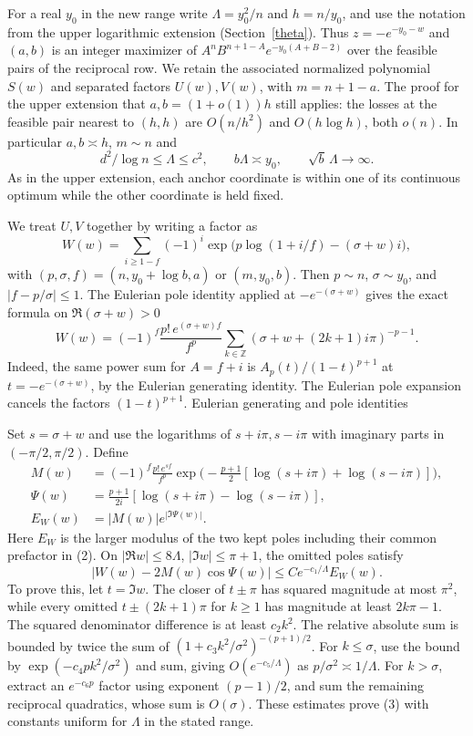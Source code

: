 \documentclass[11pt]{article}
\begin{document}
For a real $y_0$ in the new range write $\Lambda=y_0^2/n$ and $h=n/y_0$, and use the notation from the upper logarithmic extension (Section~\ref{theta}). Thus $z=-e^{-y_0-w}$ and $(a,b)$ is an integer maximizer of $A^nB^{n+1-A}e^{-y_0(A+B-2)}$ over the feasible pairs of the reciprocal row. We retain the associated normalized polynomial $S(w)$ and separated factors $U(w),V(w)$, with $m=n+1-a$. The proof for the upper extension that $a,b=(1+o(1))h$ still applies: the losses at the feasible pair nearest to $(h,h)$ are $O(n/h^2)$ and $O(h\log h)$, both $o(n)$. In particular $a,b\asymp h$, $m\sim n$ and
\[
 d^2/\log n\le\Lambda\le c^2,\qquad
 b\Lambda\asymp y_0,\qquad
 \sqrt b\,\Lambda\longrightarrow\infty .
 \tag{1}
\]
As in the upper extension, each anchor coordinate is within one of its continuous optimum while the other coordinate is held fixed.

We treat $U,V$ together by writing a factor as
\[
 W(w)=\sum_{i\ge1-f}(-1)^i
       \exp\bigl(p\log(1+i/f)-(\sigma+w)i\bigr),
\]
with $(p,\sigma,f)=(n,y_0+\log b,a)$ or $(m,y_0,b)$. Then $p\sim n$, $\sigma\sim y_0$, and $|f-p/\sigma|\le1$. The Eulerian pole identity applied at $-e^{-(\sigma+w)}$ gives the exact formula on $\Re(\sigma+w)>0$
\[
 W(w)=(-1)^f\frac{p!\,e^{(\sigma+w)f}}{f^p}
       \sum_{k\in\mathbb Z}(\sigma+w+(2k+1)i\pi)^{-p-1}.
 \tag{2}
\]
Indeed, the same power sum for $A=f+i$ is $A_p(t)/(1-t)^{p+1}$ at $t=-e^{-(\sigma+w)}$, by the Eulerian generating identity. The Eulerian pole expansion cancels the factors $(1-t)^{p+1}$. Eulerian generating and pole identities~\cite{disk}

Set $s=\sigma+w$ and use the logarithms of $s+i\pi,s-i\pi$ with imaginary parts in $(-\pi/2,\pi/2)$. Define
\[
 \begin{aligned}
 M(w)&=(-1)^f\frac{p!\,e^{sf}}{f^p}
        \exp\bigl(-\tfrac{p+1}{2}[\log(s+i\pi)+\log(s-i\pi)]\bigr),\\
 \Psi(w)&=\tfrac{p+1}{2i}[\log(s+i\pi)-\log(s-i\pi)],\\
 E_W(w)&=|M(w)|e^{|\Im\Psi(w)|}.
 \end{aligned}
\]
Here $E_W$ is the larger modulus of the two kept poles including their common prefactor in (2). On $|\Re w|\le 8\Lambda$, $|\Im w|\le\pi+1$, the omitted poles satisfy
\[
 |W(w)-2M(w)\cos\Psi(w)|\le C e^{-c_1/\Lambda} E_W(w).
 \tag{3}
\]
To prove this, let $t=\Im w$. The closer of $t\pm\pi$ has squared magnitude at most $\pi^2$, while every omitted $t\pm(2k+1)\pi$ for $k\ge1$ has magnitude at least $2k\pi-1$. The squared denominator difference is at least $c_2 k^2$. The relative absolute sum is bounded by twice the sum of $(1+c_3 k^2/\sigma^2)^{-(p+1)/2}$. For $k\le\sigma$, use the bound by $\exp(-c_4 p k^2/\sigma^2)$ and sum, giving $O(e^{-c_5/\Lambda})$ as $p/\sigma^2\asymp1/\Lambda$. For $k>\sigma$, extract an $e^{-c_6p}$ factor using exponent $(p-1)/2$, and sum the remaining reciprocal quadratics, whose sum is $O(\sigma)$. These estimates prove (3) with constants uniform for $\Lambda$ in the stated range.
\end{document}
